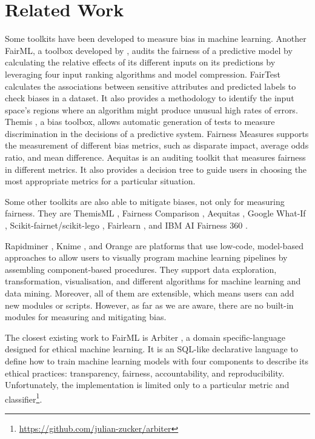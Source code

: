 \documentclass[sigconf,review]{acmart}
\begin{document}
{	\section{Related Work}
	\label{sec:related_work}
	
	Some toolkits have been developed to measure bias in machine learning. 
	Another FairML, a toolbox developed by \cite{adebayo2016fairml}, audits the fairness of a predictive model by calculating the relative effects of its different inputs on its predictions by leveraging four input ranking algorithms and model compression. 
	FairTest \cite{tramer2017fairtest} calculates the associations between sensitive attributes and predicted labels to check biases in a dataset. It also provides a methodology to identify the input space's regions where an algorithm might produce unusual high rates of errors.
	Themis \cite{galhotra2017themis}, a bias toolbox, allows automatic generation of tests to measure discrimination in the decisions of a predictive system.
	Fairness Measures \cite{zehlike2017fairness} supports the measurement of different bias metrics, such as disparate impact, average odds ratio, and mean difference. 
	Aequitas \cite{saleiro2019aequitas} is an auditing toolkit that measures fairness in different metrics. It also provides a decision tree to guide users in choosing the most appropriate metrics for a particular situation. 
	
	Some other toolkits are also able to mitigate biases, not only for measuring fairness. They are ThemisML \cite{bantilan2018themis}, Fairness Comparison \cite{friedler2019fairness}, Aequitas \cite{saleiro2019aequitas}, Google What-If \cite{googlewhatif2020}, Scikit-fairnet/scikit-lego \cite{scikitfairness2022,scikitlego2022}, Fairlearn \cite{bird2020fairlearn}, and IBM AI Fairness 360 \cite{bellamy2018ai}.
	
	Rapidminer \cite{hofmann2016rapidminer}, Knime \cite{berthold2008knime}, and Orange \cite{demsar2013orange} are platforms that use low-code, model-based approaches to allow users to visually program machine learning pipelines by assembling component-based procedures. They support data exploration, transformation, visualisation, and different algorithms for machine learning and data mining. Moreover, all of them are extensible, which means users can add new modules or scripts. However, as far as we are aware, there are no built-in modules for measuring and mitigating bias. 
	
	The closest existing work to FairML is Arbiter \cite{zucker2020arbiter}, a domain specific-language designed for ethical machine learning. It is an SQL-like declarative language to define how to train machine learning models with four components to describe its ethical practices: transparency, fairness, accountability, and reproducibility. Unfortunately, the implementation is limited only to a particular metric and classifier\footnote{\url{https://github.com/julian-zucker/arbiter}}.
	
}
\end{document}

